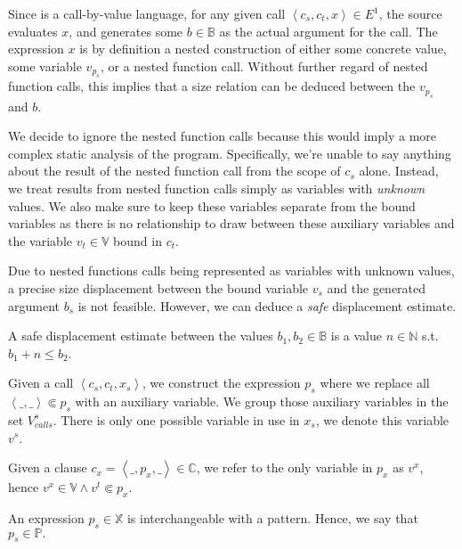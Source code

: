 Since \D{} is a call-by-value language, for any given call $\left\langle
c_s,c_t,x \right\rangle \in E^1$, the source evaluates $x$, and generates some
$b\in\mathbb{B}$ as the actual argument for the call. The expression $x$ is by
definition a nested construction of either some concrete value, some variable
$v_{p_s}$, or a nested function call. Without further regard of nested function
calls, this implies that a size relation can be deduced between the $v_{p_s}$
and $b$.

We decide to ignore the nested function calls because this would imply a more
complex static analysis of the program. Specifically, we're unable to say
anything about the result of the nested function call from the scope of $c_s$
alone. Instead, we treat results from nested function calls simply as variables
with \emph{unknown} values. We also make sure to keep these variables separate
from the bound variables as there is no relationship to draw between these
auxiliary variables and the variable $v_t\in\mathbb{V}$ bound in $c_t$.

Due to nested functions calls being represented as variables with unknown
values, a precise size displacement between the bound variable $v_s$ and the
generated argument $b_s$ is not feasible. However, we can deduce a \emph{safe}
displacement estimate.

\begin{definition} A safe displacement estimate between the values
$b_1,b_2\in\mathbb{B}$ is a value $n\in\mathbb{N}$ s.t. $b_1+n\leq
b_2$.\end{definition}

\begin{definition}\label{definition:source-variable} Given a call
$\left\langle c_s,c_t,x_s\right\rangle$, we construct the expression $p_s$ where we
replace all $\left\langle \_,\_ \right\rangle\Subset p_s$ with an auxiliary
variable. We group those auxiliary variables in the set $V^s_{calls}$. There is
only one possible variable in use in $x_s$, we denote this variable
$v^s$.\end{definition} 

\begin{definition}\label{definition:clause-variable} Given a clause
$c_x=\left\langle \_,p_x,\_  \right\rangle \in \mathbb{C}$, we refer to the
only variable in $p_x$ as $v^x$, hence $v^x\in\mathbb{V} \wedge v^t\Subset
p_x$.\end{definition}

\begin{lemma} An expression $p_s\in\mathbb{X}$ is interchangeable with a
pattern. Hence, we say that $p_s\in\mathbb{P}.$\end{lemma}

